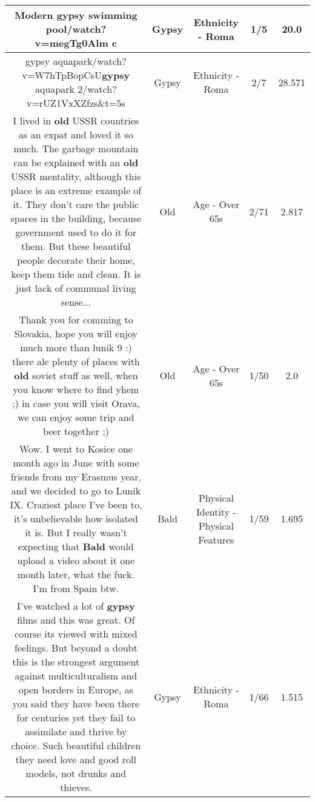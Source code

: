 \documentclass[11pt]{article}
\newlength\mylength
\begin{document}
\begin{center}
\begin{longtable}{|C{.65\mylength}|C{.30\mylength}|C{.12\mylength}|C{.12\mylength}|C{.12\mylength}|}
  \small Modern \textbf{gypsy} swimming pool/watch?v=megTg0Alm c\normalsize   & Gypsy & Ethnicity - Roma & 1/5 & 20.0 \\  \hline
  \small gypsy aquapark/watch?v=W7hTpBopCsU\textbf{gypsy} aquapark 2/watch?v=rUZ1VxXZfzs\&t=5s\normalsize   & Gypsy & Ethnicity - Roma & 2/7 & 28.571 \\  \hline
  \small I lived in \textbf{old} USSR countries as an expat and loved it so much. The garbage mountain can be explained with an \textbf{old} USSR mentality, although this place is an extreme example of it. They don't care the public spaces in the building, because government used to do it for them. But these beautiful people decorate their home, keep them tide and clean. It is just lack of communal living sense...\normalsize   & Old & Age - Over 65s & 2/71 & 2.817 \\  \hline
  \small Thank you for comming to Slovakia, hope you will enjoy much more than lunik 9 :) there ale plenty of places with \textbf{old} soviet stuff as well, when you know where to find yhem ;) in case you will visit Orava, we can enjoy some trip and beer together ;)\normalsize   & Old & Age - Over 65s & 1/50 & 2.0 \\  \hline
  \small Wow. I went to Kosice one month ago in June with some friends from my Erasmus year, and we decided to go to Lunik IX. Craziest place I've been to, it's unbelievable how isolated it is. But I really wasn't expecting that \textbf{Bald} would upload a video about it one month later, what the fuck. I'm from Spain btw.\normalsize   & Bald & Physical Identity - Physical Features & 1/59 & 1.695 \\  \hline
  \small I've watched a lot of \textbf{gypsy} films and this  was great.  Of course its viewed with mixed feelings.  But beyond a doubt this is the strongest argument against multiculturalism and open borders in Europe, as you said they have been there for centuries yet they fail to assimilate and thrive by choice.  Such beautiful children they need love and good roll models, not drunks and thieves.\normalsize   & Gypsy & Ethnicity - Roma & 1/66 & 1.515 \\  \hline

\end{longtable}
\end{center}
\end{document}

